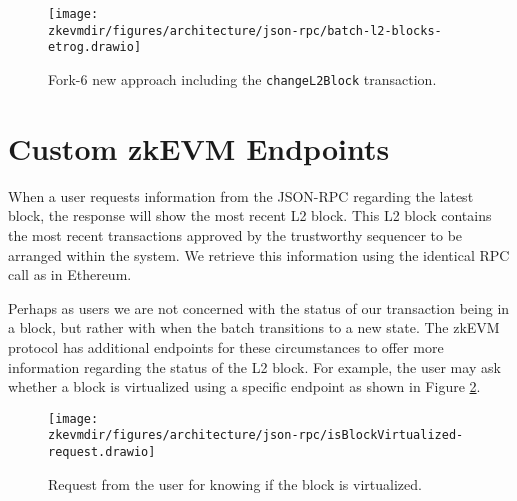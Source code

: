 \begin{figure}[H]
\centering
\texttt{[image: \\zkevmdir/figures/architecture/json-rpc/batch-l2-blocks-etrog.drawio]}
\caption{Fork-6 new approach including the \texttt{changeL2Block} transaction.}
\label{fig:fork-6}
\end{figure}




\section{Custom zkEVM Endpoints}

%

When a user requests information from the JSON-RPC regarding the latest block, the response will show the most recent L2 block. This L2 block contains the most recent transactions approved by the trustworthy sequencer to be arranged within the system. We retrieve this information using the identical RPC call as in Ethereum.

Perhaps as users we are not concerned with the status of our transaction being in a block, but rather with when the batch transitions to a new state. The zkEVM protocol has additional endpoints for these circumstances to offer more information regarding the status of the L2 block. For example, the user may ask whether a block is virtualized using a specific endpoint as shown in Figure \ref{fig:is-block-virtualized}.

\begin{figure}[H]
\centering
\texttt{[image: \\zkevmdir/figures/architecture/json-rpc/isBlockVirtualized-request.drawio]}
\caption{Request from the user for knowing if the block is virtualized.}
\label{fig:is-block-virtualized}
\end{figure}

